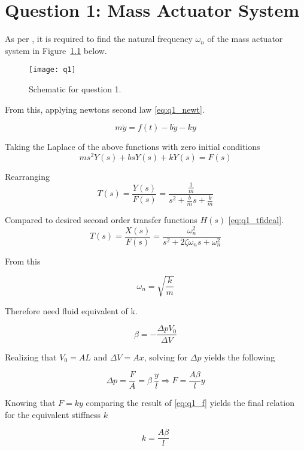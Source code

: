\chapter{Question 1: Mass Actuator System}
\label{chap:q1}

As per \cite{assign}, it is required to find the natural frequency $\omega_n$ of the mass actuator system in Figure~\ref{fig:q1} below.

\begin{figure}[H]
	\centering
	\texttt{[image: q1]}
	\caption{Schematic for question 1.}
	\label{fig:q1}
\end{figure}

From this, applying newtons second law \ref{eq:q1_newt}.

\begin{equation}
	\label{eq:q1_newt}
	m \ddot{y} = f(t) - b\dot{y} - k y
\end{equation}

Taking the Laplace of the above functions with zero initial conditions
\begin{equation}
	ms^2 Y(s) + b s Y(s) + k Y(s) = F(s)
\end{equation}

Rearranging
\begin{equation}
	\label{eq:q1_tfactual}
	T(s) = \frac{Y(s)}{F(s)} = \frac{\frac{1}{m}}{s^2 + \frac{b}{m}s + \frac{k}{m}}
\end{equation}



Compared to desired second order transfer functions $H(s)$ \ref{eq:q1_tfideal}.
\begin{equation}
	\label{eq:q1_tfideal}
	T(s)= \frac{X(s)}{F(s)} = \frac{\omega_n^2}{s^2+2\zeta\omega_n s + \omega_n^2}
\end{equation}


From this

\begin{equation}
	\label{eq:q1_wn}	
	\omega_n = \sqrt{\frac{k}{m}}	
\end{equation}

Therefore need fluid equivalent of k.

\begin{equation}
	\label{eq:q1_beta}
	\beta = - \frac{\Delta p V_0}{\Delta V}	
\end{equation}

Realizing that $V_0 = AL$ and $\Delta V = Ax$, solving for $\Delta p$ yields the following

\begin{equation}
	\label{eq:q1_f}
	\Delta p = \frac{F}{A}= \beta \ \frac{y}{l} \Rightarrow F = \frac{A\beta}{l}y 	
\end{equation}

Knowing that $F = ky$ comparing the result of \ref{eq:q1_f} yields the final relation for the equivalent stiffness $k$

\begin{equation}
	\label{eq:q1_k}
	 k = \frac{A\beta}{l} 	
\end{equation}


